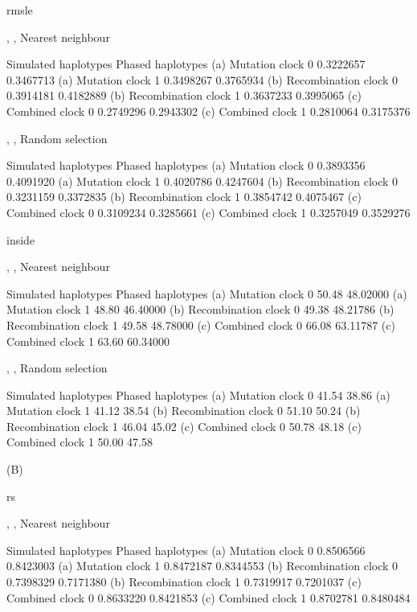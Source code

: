 rmsle

, , Nearest neighbour

                           Simulated haplotypes  Phased haplotypes
(a) Mutation clock 0                   0.3222657         0.3467713
(a) Mutation clock 1                   0.3498267         0.3765934
(b) Recombination clock 0              0.3914181         0.4182889
(b) Recombination clock 1              0.3637233         0.3995065
(c) Combined clock 0                   0.2749296         0.2943302
(c) Combined clock 1                   0.2810064         0.3175376

, , Random selection

                           Simulated haplotypes  Phased haplotypes
(a) Mutation clock 0                   0.3893356         0.4091920
(a) Mutation clock 1                   0.4020786         0.4247604
(b) Recombination clock 0              0.3231159         0.3372835
(b) Recombination clock 1              0.3854742         0.4075467
(c) Combined clock 0                   0.3109234         0.3285661
(c) Combined clock 1                   0.3257049         0.3529276


inside

, , Nearest neighbour

                           Simulated haplotypes  Phased haplotypes
(a) Mutation clock 0                       50.48          48.02000
(a) Mutation clock 1                       48.80          46.40000
(b) Recombination clock 0                  49.38          48.21786
(b) Recombination clock 1                  49.58          48.78000
(c) Combined clock 0                       66.08          63.11787
(c) Combined clock 1                       63.60          60.34000

, , Random selection

                           Simulated haplotypes  Phased haplotypes
(a) Mutation clock 0                       41.54             38.86
(a) Mutation clock 1                       41.12             38.54
(b) Recombination clock 0                  51.10             50.24
(b) Recombination clock 1                  46.04             45.02
(c) Combined clock 0                       50.78             48.18
(c) Combined clock 1                       50.00             47.58



(B)

rs

, , Nearest neighbour

                           Simulated haplotypes  Phased haplotypes
(a) Mutation clock 0                   0.8506566         0.8423003
(a) Mutation clock 1                   0.8472187         0.8344553
(b) Recombination clock 0              0.7398329         0.7171380
(b) Recombination clock 1              0.7319917         0.7201037
(c) Combined clock 0                   0.8633220         0.8421853
(c) Combined clock 1                   0.8702781         0.8480484

